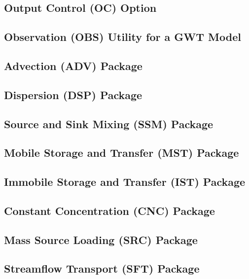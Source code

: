 \newpage
\subsection{Output Control (OC) Option}


\newpage
\subsection{Observation (OBS) Utility for a GWT Model}


\newpage
\subsection{Advection (ADV) Package}


\newpage
\subsection{Dispersion (DSP) Package}


\newpage
\subsection{Source and Sink Mixing (SSM) Package}


\newpage
\subsection{Mobile Storage and Transfer (MST) Package}


\newpage
\subsection{Immobile Storage and Transfer (IST) Package}


\newpage
\subsection{Constant Concentration (CNC) Package}


\newpage
\subsection{Mass Source Loading (SRC) Package}


\newpage
\subsection{Streamflow Transport (SFT) Package}


